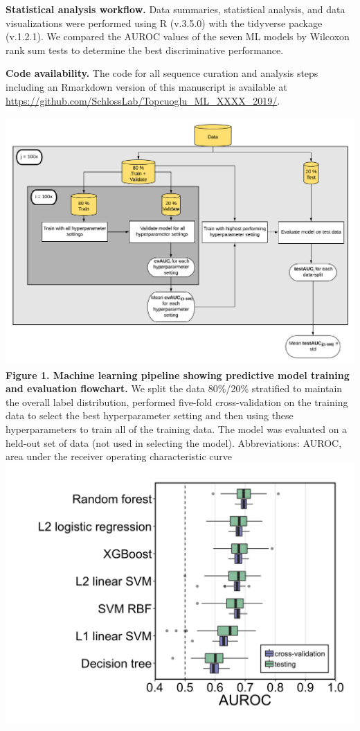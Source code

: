 \documentclass[11pt,]{article}
\begin{document}
\textbf{Statistical analysis workflow.} Data summaries, statistical
analysis, and data visualizations were performed using R (v.3.5.0) with
the tidyverse package (v.1.2.1). We compared the AUROC values of the
seven ML models by Wilcoxon rank sum tests to determine the best
discriminative performance.

\textbf{Code availability.} The code for all sequence curation and
analysis steps including an Rmarkdown version of this manuscript is
available at
\url{https://github.com/SchlossLab/Topcuoglu_ML_XXXX_2019/}.

\newpage

\includegraphics{Figure_1} \textbf{Figure 1. Machine learning pipeline
showing predictive model training and evaluation flowchart. } We split
the data 80\%/20\% stratified to maintain the overall label
distribution, performed five-fold cross-validation on the training data
to select the best hyperparameter setting and then using these
hyperparameters to train all of the training data. The model was
evaluated on a held-out set of data (not used in selecting the model).
Abbreviations: AUROC, area under the receiver operating characteristic
curve \newpage
\includegraphics{Figure_2.png}
\end{document}

